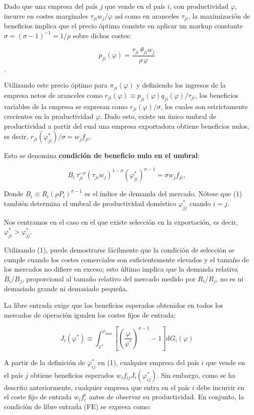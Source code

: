 \documentclass[10pt,a4paper]{article}
\begin{document}
Dado que una empresa del país $j$ que vende en el país $i$, con productividad $\varphi$, incurre en costes marginales $\tau_{ji} w_j / \varphi$ así como en aranceles $\tau_{ji}$, la maximización de beneficios implica que el precio óptimo consiste en aplicar un markup constante $\sigma = (\sigma - 1)^{-1} = 1/\rho$ sobre dichos costes:

$$p_{ji}(\varphi) = \frac{\tau_{ji}\,\theta_{ji} w_j}{\rho \,\varphi}$$.

Utilizando este precio óptimo para $\pi_{ji}(\varphi)$ y definiendo los ingresos de la empresa netos de aranceles como $r_{ji}(\varphi) \equiv p_{ji}(\varphi) q_{ji}(\varphi)/\tau_{ji}$, los beneficios variables de la empresa se expresan como $r_{ji}(\varphi)/\sigma$, los cuales son estrictamente crecientes en la productividad $\varphi$. Dado esto, existe un único umbral de productividad a partir del cual una empresa exportadora obtiene beneficios nulos, es decir, $r_{ji}(\varphi_{ji}^*)/\sigma = w_j f_{ji}$. 

Esto se denomina \textbf{condición de beneficio nulo en el umbral}:

$$B_i \, \tau_{ji}^{-\sigma} (\tau_{ji} w_j)^{1-\sigma} (\varphi_{ji}^*)^{\sigma-1} = \sigma w_j f_{ji}, \tag{1}$$

Donde $B_i \equiv R_i (\rho P_i)^{\sigma-1}$ es el índice de demanda del mercado. Nótese que (1) también determina el umbral de productividad doméstico $\varphi_{jj}^*$ cuando $i = j$. 

Nos centramos en el caso en el que existe selección en la exportación, es decir, $\varphi_{ji}^* > \varphi_{jj}^*$.

Utilizando (1), puede demostrarse fácilmente que la condición de selección se cumple cuando los costes comerciales son suficientemente elevados y el tamaño de los mercados no difiere en exceso; esto último implica que la demanda relativa $B_i/B_j$, proporcional al tamaño relativo del mercado medido por $R_i/R_j$, no es ni demasiado grande ni demasiado pequeña.

La libre entrada exige que los beneficios esperados obtenidos en todos los mercados de operación igualen los costes fijos de entrada:

$$J_i(\varphi^*) \equiv \int_{\varphi^*}^{\varphi_{\max}} \left[ \left(\frac{\varphi}{\varphi^*}\right)^{\sigma-1} - 1 \right] \mathrm dG_i(\varphi)$$

A partir de la definición de $\varphi_{ij}^*$ en (1), cualquier empresa del país $i$ que vende en el país $j$ obtiene beneficios esperados $w_i f_{ij} J_i(\varphi_{ij}^*)$. Sin embargo, como se ha descrito anteriormente, cualquier empresa que entra en el país $i$ debe incurrir en el coste fijo de entrada $w_i f_i^e$ antes de observar su productividad. En conjunto, la condición de libre entrada (FE) se expresa como:
\end{document}
